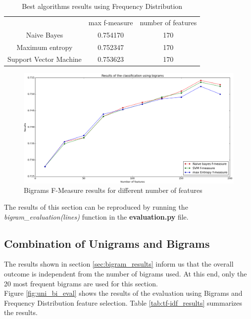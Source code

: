 \begin{table}[H]
\begin{tabular}{c|c|c}
		~	&				max f-measure 	& number of features \\
Naive Bayes			&		 0.754170 			&	170\\
Maximum entropy		&		 0.752347 			&	170\\
Support Vector Machine	&	 0.753623 			&	170\\
\end{tabular}
\caption{Best algorithms results using Frequency Distribution}\label{tab:bigram_results}
\end{table}


\begin{figure}[H]
  \centering
  \includegraphics[width=160mm]{figures/bigram_results_graph.png}
  \caption{Bigrams F-Measure results for different number of features \label{fig:bigram_eval}}
\end{figure}

The results of this section can be reproduced by running the \emph{bigram\_evaluation(lines)} function in the  \textbf{evaluation.py} file.\\

\subsection{Combination of Unigrams and Bigrams }
\label{sec:combined_results}
The results shown in section \ref{sec:bigram_results} inform us that the overall outcome is independent from the number of bigrams used. At this end, only the 20 most frequent bigrams are used for this section.\\
Figure \ref{fig:uni_bi_eval} shows the results of the evaluation using Bigrams and Frequency Distribution feature selection. Table \ref{tab:tf-idf_results} summarizes the results.



